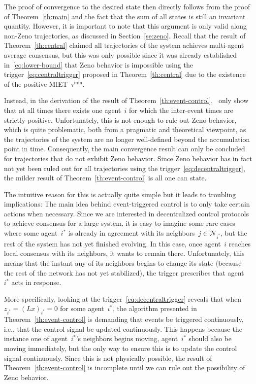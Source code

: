 \documentclass{autart}
\newcommand{\NN}{{\mathcal{N}}}
\newcommand{\changes}[1]{{\color{blue} #1}}
\renewcommand{\changes}[1]{#1}
\begin{document}
The proof of convergence to the desired state then directly follows
from the proof of Theorem~\ref{th:main} and the fact that the sum of
all states is still an invariant quantity. However, it is 
important to note that this argument is only valid along non-Zeno
trajectories, as discussed in Section~\ref{se:zeno}. Recall that the
result of Theorem~\ref{th:central} claimed all trajectories of the
system achieves multi-agent average consensus, but this was only
possible since it was already established in~\eqref{eq:lower-bound}
that Zeno behavior is impossible using the
trigger~\eqref{eq:centraltrigger} proposed in
Theorem~\ref{th:central} \changes{due to the existence of the positive MIET~$\tau^\text{min}$.}

Instead, in the derivation of the result of
Theorem~\ref{th:event-control},~\cite{DVD-EF-KHJ:12} only show that at
all times there exists one agent~$i$ for which the inter-event times
are strictly positive. Unfortunately, this is not enough to rule out
Zeno behavior, which is quite problematic, both from a pragmatic and
theoretical viewpoint, as the trajectories of the system are no longer
well-defined beyond the accumulation point in time. Consequently, the
main convergence result can only be concluded for trajectories that do
not exhibit Zeno behavior. Since Zeno behavior has in fact not yet
been ruled out for all trajectories using the
trigger~\eqref{eq:decentraltrigger}, the milder result of
Theorem~\ref{th:event-control} is all one can state.

{The intuitive reason for this is actually quite simple but it leads to
troubling implications: The main idea behind event-triggered control
is to only take certain actions when necessary. Since we are
interested in decentralized control protocols to achieve consensus for
a large system, it is easy to imagine some rare cases where some
agent~$i^*$ is already in agreement with its neighbors~$j \in
\NN_{i^*}$, but the rest of the system has not yet finished
evolving. In this case, once agent~$i$ reaches local consensus with
its neighbors, it wants to remain there. Unfortunately, this means
that the instant any of its neighbors begins to change its state
(because the rest of the network has not yet stabilized), the trigger
prescribes that agent~$i^*$ acts in response.

More specifically, looking at the trigger~\eqref{eq:decentraltrigger}
reveals that when~$z_{i^*} = (Lx)_{i^*} = 0$ for some agent~$i^*$, the
algorithm presented in Theorem~\ref{th:event-control} is demanding
that events be triggered continuously, i.e., that the control signal
be updated continuously. This happens because the instance one of
agent~$i^*$'s neighbors begins moving, agent~$i^*$ should also be
moving immediately, but the only way to ensure this is to update the
control signal continuously. Since this is not physically possible,
the result of Theorem~\ref{th:event-control} is incomplete until we
can rule out the possibility of Zeno behavior.
}
\end{document}
